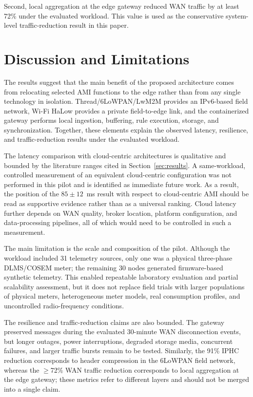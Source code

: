 \documentclass[conference]{IEEEtran}
\begin{document}
Second, local aggregation at the edge gateway reduced WAN traffic by at least 72\% under the evaluated workload. This value is used as the conservative system-level traffic-reduction result in this paper.

\section{Discussion and Limitations}
\label{sec:discussion}

The results suggest that the main benefit of the proposed architecture comes from relocating selected AMI functions to the edge rather than from any single technology in isolation. Thread/6LoWPAN/LwM2M provides an IPv6-based field network, Wi-Fi HaLow provides a private field-to-edge link, and the containerized gateway performs local ingestion, buffering, rule execution, storage, and synchronization. Together, these elements explain the observed latency, resilience, and traffic-reduction results under the evaluated workload.

The latency comparison with cloud-centric architectures is qualitative and bounded by the literature ranges cited in Section~\ref{sec:results}. A same-workload, controlled measurement of an equivalent cloud-centric configuration was not performed in this pilot and is identified as immediate future work. As a result, the position of the $85 \pm 12$~ms result with respect to cloud-centric AMI should be read as supportive evidence rather than as a universal ranking. Cloud latency further depends on WAN quality, broker location, platform configuration, and data-processing pipelines, all of which would need to be controlled in such a measurement.

The main limitation is the scale and composition of the pilot. Although the workload included 31 telemetry sources, only one was a physical three-phase DLMS/COSEM meter; the remaining 30 nodes generated firmware-based synthetic telemetry. This enabled repeatable laboratory evaluation and partial scalability assessment, but it does not replace field trials with larger populations of physical meters, heterogeneous meter models, real consumption profiles, and uncontrolled radio-frequency conditions.

The resilience and traffic-reduction claims are also bounded. The gateway preserved messages during the evaluated 30-minute WAN disconnection events, but longer outages, power interruptions, degraded storage media, concurrent failures, and larger traffic bursts remain to be tested. Similarly, the 91\% IPHC reduction corresponds to header compression in the 6LoWPAN field network, whereas the $\geq$72\% WAN traffic reduction corresponds to local aggregation at the edge gateway; these metrics refer to different layers and should not be merged into a single claim.
\end{document}
